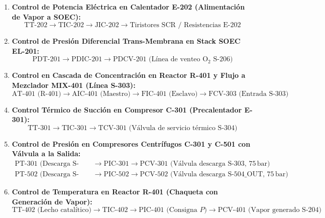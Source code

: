 \documentclass[10pt,letterpaper]{article}
\begin{document}
\begin{enumerate}
    \item \textbf{Control de Potencia Eléctrica en Calentador E-202 (Alimentación de Vapor a SOEC):}
    \begin{equation*}
        \text{TT-202} \longrightarrow \text{TIC-202} \longrightarrow \text{JIC-202} \longrightarrow \text{Tiristores SCR / Resistencias E-202}
    \end{equation*}

    \item \textbf{Control de Presión Diferencial Trans-Membrana en Stack SOEC EL-201:}
    \begin{equation*}
        \text{PDT-201} \longrightarrow \text{PDIC-201} \longrightarrow \text{PDCV-201 (Línea de venteo } \text{O}_2\text{ S-206)}
    \end{equation*}

    \item \textbf{Control en Cascada de Concentración en Reactor R-401 y Flujo a Mezclador MIX-401 (Línea S-303):}
    \begin{equation*}
        \text{AT-401 (R-401)} \longrightarrow \text{AIC-401 (Maestro)} \longrightarrow \text{FIC-401 (Esclavo)} \longrightarrow \text{FCV-303 (Entrada S-303)}
    \end{equation*}

    \item \textbf{Control Térmico de Succión en Compresor C-301 (Precalentador E-301):}
    \begin{equation*}
        \text{TT-301} \longrightarrow \text{TIC-301} \longrightarrow \text{TCV-301 (Válvula de servicio térmico S-304)}
    \end{equation*}

    \item \textbf{Control de Presión en Compresores Centrífugos C-301 y C-501 con Válvula a la Salida:}
    \begin{align*}
        \text{PT-301 (Descarga S-303)} &\longrightarrow \text{PIC-301} \longrightarrow \text{PCV-301 (Válvula descarga S-303, $75\,\text{bar}$)} \\
        \text{PT-502 (Descarga S-504\_OUT)} &\longrightarrow \text{PIC-502} \longrightarrow \text{PCV-502 (Válvula descarga S-504\_OUT, $75\,\text{bar}$)}
    \end{align*}

    \item \textbf{Control de Temperatura en Reactor R-401 (Chaqueta con Generación de Vapor):}
    \begin{equation*}
        \text{TT-402 (Lecho catalítico)} \longrightarrow \text{TIC-402} \longrightarrow \text{PIC-401 (Consigna $P$)} \longrightarrow \text{PCV-401 (Vapor generado S-204)}
    \end{equation*}


\end{enumerate}
\end{document}
